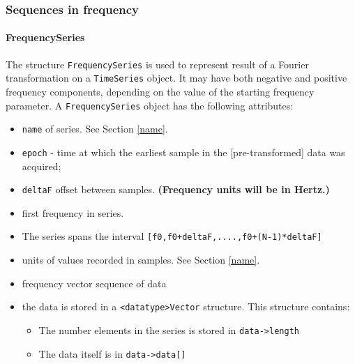 \documentclass[]{ligodcc}
\renewcommand{\texttt}[1]{{\ttfamily\color{blue}#1}}
\begin{document}
\subsubsection{Sequences in frequency}

\paragraph{{\texttt {FrequencySeries}} \\}

The structure {\tt FrequencySeries} is used to represent result of a Fourier
transformation on a {\tt TimeSeries} object. It may have both negative and
positive frequency components, depending on the value of the starting
frequency parameter. A {\tt FrequencySeries} object has the following
attributes:

\begin{itemize}
\vspace{-0.15in}
\item
{\tt name} of series. See Section \ref{name}.
\vspace{-0.15in}
\item
{\tt epoch} - time at which the earliest sample in 
the [pre-transformed] data was acquired;
\vspace{-0.15in}
\item
{\tt deltaF} offset between samples.  {\bf (Frequency units will be in Hertz.)}
\vspace{-0.15in}
\item
first frequency in series. 
\vspace{-0.15in}
\item
The series spans the interval {\tt [f0,f0+deltaF,....,f0+(N-1)*deltaF] }
\vspace{-0.15in}
\item
units of values recorded in samples. See Section \ref{name}.
\vspace{-0.15in}
\item
frequency vector sequence of data
\vspace{-0.15in}
\item
the data is stored in a {\tt <datatype>Vector}  structure. This structure contains:
\begin{itemize}
\vspace{-0.10in}
\item
The number elements in the series is stored in {\tt data->length}
\vspace{-0.10in}
\item
The data itself is in {\tt data->data[]}
\end{itemize}
\end{itemize}
\end{document}
